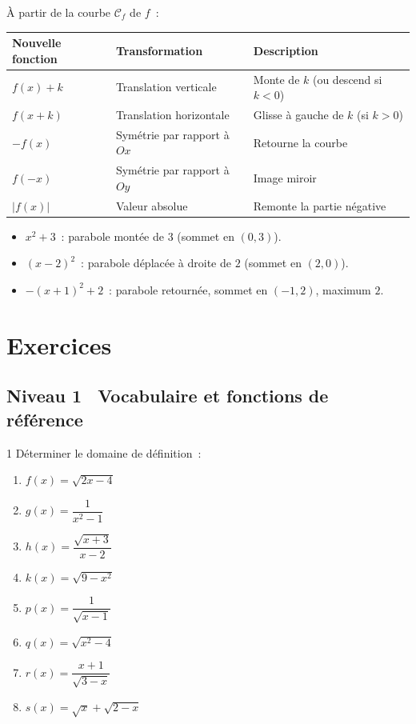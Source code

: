 \begin{prop}
\`A partir de la courbe $\mathcal{C}_f$ de $f$~:
\begin{center}
\small
\renewcommand{\arraystretch}{1.4}
\begin{tabularx}{\linewidth}{|l|l|X|}
\hline
\rowcolor{BN!10} Nouvelle fonction & Transformation & Description \\
\hline
$f(x)+k$ & Translation verticale & Monte de $k$ (ou descend si $k<0$) \\
$f(x+k)$ & Translation horizontale & Glisse \`a gauche de $k$ (si $k>0$) \\
$-f(x)$ & Sym\'etrie par rapport \`a $Ox$ & Retourne la courbe \\
$f(-x)$ & Sym\'etrie par rapport \`a $Oy$ & Image miroir \\
$|f(x)|$ & Valeur absolue & Remonte la partie n\'egative \\
\hline
\end{tabularx}
\end{center}
\end{prop}

\begin{ex}[Transformations de $x^2$]
\begin{itemize}
  \item $x^2+3$~: parabole mont\'ee de $3$ (sommet en $(0,3)$).
  \item $(x-2)^2$~: parabole d\'eplac\'ee \`a droite de $2$ (sommet en $(2,0)$).
  \item $-(x+1)^2+2$~: parabole retourn\'ee, sommet en $(-1,2)$, maximum $2$.
\end{itemize}
\end{ex}

\section{Exercices}

\subsection*{\quad Niveau 1 \textemdash\ Vocabulaire et fonctions de r\'ef\'erence}

\begin{exo}{1}
D\'eterminer le domaine de d\'efinition~:
\begin{enumerate}
  \item $f(x) = \sqrt{2x-4}$
  \item $g(x) = \dfrac{1}{x^2-1}$
  \item $h(x) = \dfrac{\sqrt{x+3}}{x-2}$
  \item $k(x) = \sqrt{9-x^2}$
  \item $p(x) = \dfrac{1}{\sqrt{x-1}}$
  \item $q(x) = \sqrt{x^2-4}$
  \item $r(x) = \dfrac{x+1}{\sqrt{3-x}}$
  \item $s(x) = \sqrt{x} + \sqrt{2-x}$
\end{enumerate}
\end{exo}


